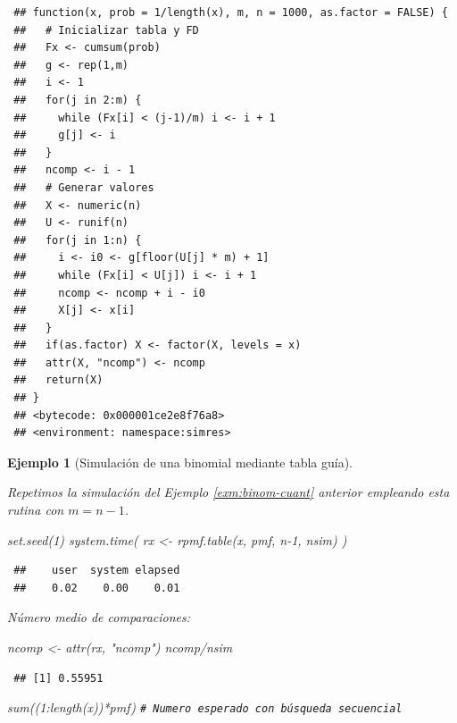 \documentclass[
  10pt,
]{book}
\newenvironment{Shaded}{\begin{snugshade}}{\end{snugshade}}
\newcommand{\CommentTok}[1]{\textcolor[rgb]{0.56,0.35,0.01}{\textit{#1}}}
\newcommand{\DecValTok}[1]{\textcolor[rgb]{0.00,0.00,0.81}{#1}}
\newcommand{\FunctionTok}[1]{\textcolor[rgb]{0.00,0.00,0.00}{#1}}
\newcommand{\NormalTok}[1]{#1}
\newcommand{\OtherTok}[1]{\textcolor[rgb]{0.56,0.35,0.01}{#1}}
\newcommand{\SpecialCharTok}[1]{\textcolor[rgb]{0.00,0.00,0.00}{#1}}
\newcommand{\StringTok}[1]{\textcolor[rgb]{0.31,0.60,0.02}{#1}}
\theoremstyle{break}
\newtheorem{example}{Ejemplo}[chapter]
\theoremstyle{nonumberplain}
\renewcommand{\CommentTok}[1]{\textcolor[rgb]{0.41,0.41,0.41}{\texttt{#1}}}
\begin{document}
\begin{verbatim}
 ## function(x, prob = 1/length(x), m, n = 1000, as.factor = FALSE) {
 ##   # Inicializar tabla y FD
 ##   Fx <- cumsum(prob)
 ##   g <- rep(1,m)
 ##   i <- 1
 ##   for(j in 2:m) {
 ##     while (Fx[i] < (j-1)/m) i <- i + 1
 ##     g[j] <- i
 ##   }
 ##   ncomp <- i - 1
 ##   # Generar valores
 ##   X <- numeric(n)
 ##   U <- runif(n)
 ##   for(j in 1:n) {
 ##     i <- i0 <- g[floor(U[j] * m) + 1]
 ##     while (Fx[i] < U[j]) i <- i + 1
 ##     ncomp <- ncomp + i - i0
 ##     X[j] <- x[i]
 ##   }
 ##   if(as.factor) X <- factor(X, levels = x)
 ##   attr(X, "ncomp") <- ncomp
 ##   return(X)
 ## }
 ## <bytecode: 0x000001ce2e8f76a8>
 ## <environment: namespace:simres>
\end{verbatim}

\begin{example}[Simulación de una binomial mediante tabla guía]
\protect\hypertarget{exm:binom-tabla}{}\label{exm:binom-tabla}

Repetimos la simulación del Ejemplo \ref{exm:binom-cuant} anterior empleando esta rutina con \(m=n-1\).

\begin{Shaded}
\begin{Highlighting}[]
\FunctionTok{set.seed}\NormalTok{(}\DecValTok{1}\NormalTok{)}
\FunctionTok{system.time}\NormalTok{( rx }\OtherTok{\textless{}{-}} \FunctionTok{rpmf.table}\NormalTok{(x, pmf, n}\DecValTok{{-}1}\NormalTok{, nsim) )}
\end{Highlighting}
\end{Shaded}

\begin{verbatim}
 ##    user  system elapsed 
 ##    0.02    0.00    0.01
\end{verbatim}

Número medio de comparaciones:

\begin{Shaded}
\begin{Highlighting}[]
\NormalTok{ncomp }\OtherTok{\textless{}{-}} \FunctionTok{attr}\NormalTok{(rx, }\StringTok{"ncomp"}\NormalTok{)}
\NormalTok{ncomp}\SpecialCharTok{/}\NormalTok{nsim}
\end{Highlighting}
\end{Shaded}

\begin{verbatim}
 ## [1] 0.55951
\end{verbatim}

\begin{Shaded}
\begin{Highlighting}[]
\FunctionTok{sum}\NormalTok{((}\DecValTok{1}\SpecialCharTok{:}\FunctionTok{length}\NormalTok{(x))}\SpecialCharTok{*}\NormalTok{pmf) }\CommentTok{\# Numero esperado con búsqueda secuencial}
\end{Highlighting}
\end{Shaded}


\end{example}
\end{document}
